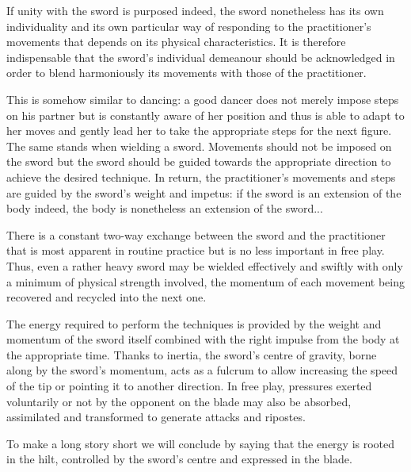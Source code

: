If unity with the sword is purposed indeed, the sword nonetheless has its own individuality and its own particular way of responding to the practitioner's movements that depends on its physical characteristics.
It is therefore indispensable that the sword's individual demeanour should be acknowledged in order to blend harmoniously its movements with those of the practitioner.

This is somehow similar to dancing: a good dancer does not merely impose steps on his partner but is constantly aware of her position and thus is able to adapt to her moves and gently lead her to take the appropriate steps for the next figure. 
The same stands when wielding a sword.
Movements should not be imposed on the sword but the sword should be guided towards the appropriate direction to achieve the desired technique.
In return, the practitioner's movements and steps are guided by the sword's weight and impetus: if the sword is an extension of the body indeed, the body is nonetheless an extension of the sword...

There is a constant two-way exchange between the sword and the practitioner that is most apparent in routine practice but is no less important in free play.
Thus, even a rather heavy sword may be wielded effectively and swiftly with only a minimum of physical strength involved, the momentum of each movement being recovered and recycled into the next one.

The energy required to perform the techniques is provided by the weight and momentum of the sword itself combined with the right impulse from the body at the appropriate time.
Thanks to inertia, the sword's centre of gravity, borne along by the sword's momentum, acts as a fulcrum to allow increasing the speed of the tip or pointing it to another direction.
In free play, pressures exerted voluntarily or not by the opponent on the blade may also be absorbed, assimilated and transformed to generate attacks and ripostes.

To make a long story short we will conclude by saying that the energy is rooted in the hilt, controlled by the sword's centre and expressed in the blade.
